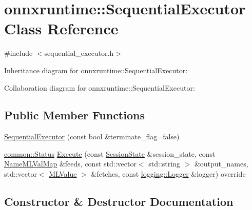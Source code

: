 \hypertarget{classonnxruntime_1_1SequentialExecutor}{}\section{onnxruntime\+:\+:Sequential\+Executor Class Reference}
\label{classonnxruntime_1_1SequentialExecutor}


{\ttfamily \#include $<$sequential\+\_\+executor.\+h$>$}



Inheritance diagram for onnxruntime\+:\+:Sequential\+Executor\+:


Collaboration diagram for onnxruntime\+:\+:Sequential\+Executor\+:
\subsection*{Public Member Functions}
\begin{DoxyCompactItemize}
\item 
\mbox{\hyperlink{classonnxruntime_1_1SequentialExecutor_a6ecacd4234f20b3bf409a7d2a6129c8f}{Sequential\+Executor}} (const bool \&terminate\+\_\+flag=false)
\item 
\mbox{\hyperlink{classonnxruntime_1_1common_1_1Status}{common\+::\+Status}} \mbox{\hyperlink{classonnxruntime_1_1SequentialExecutor_ade54efc80e70d9e2d1d5024abe40a60c}{Execute}} (const \mbox{\hyperlink{classonnxruntime_1_1SessionState}{Session\+State}} \&session\+\_\+state, const \mbox{\hyperlink{namespaceonnxruntime_a48b01f0410ec8d693dbd40d1132bd66c}{Name\+M\+L\+Val\+Map}} \&feeds, const std\+::vector$<$ std\+::string $>$ \&output\+\_\+names, std\+::vector$<$ \mbox{\hyperlink{classonnxruntime_1_1MLValue}{M\+L\+Value}} $>$ \&fetches, const \mbox{\hyperlink{classonnxruntime_1_1logging_1_1Logger}{logging\+::\+Logger}} \&logger) override
\end{DoxyCompactItemize}


\subsection{Constructor \& Destructor Documentation}
\mbox{\label{classonnxruntime_1_1SequentialExecutor_a6ecacd4234f20b3bf409a7d2a6129c8f}} 
